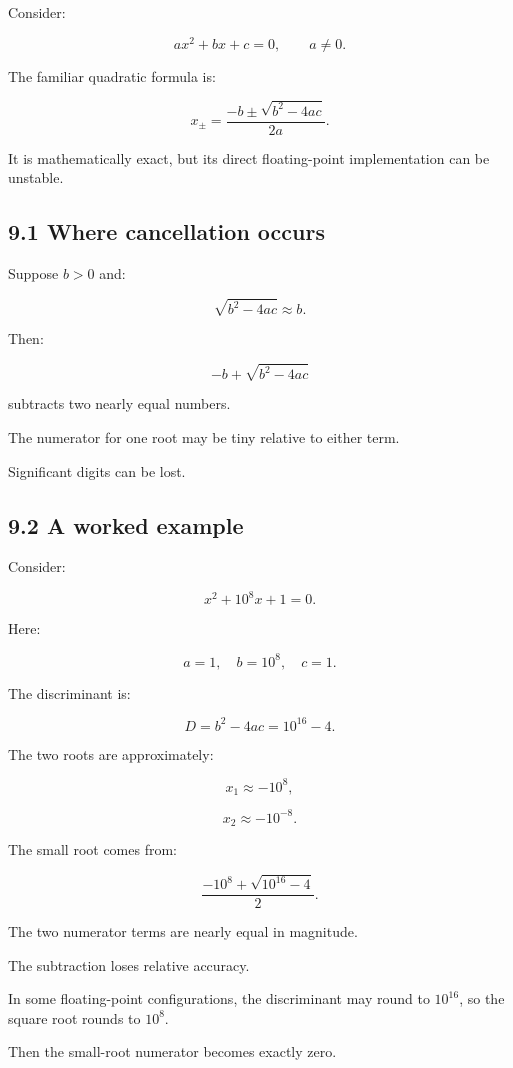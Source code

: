 Consider:

\[ \boxed{ax^2+bx+c=0}, \qquad a\ne0. \]

The familiar quadratic formula is:

\[ \boxed{ x_\pm= \frac{-b\pm\sqrt{b^2-4ac}}{2a} }. \]

It is mathematically exact, but its direct floating-point implementation can be unstable.

\subsection{9.1 Where cancellation occurs}\label{02-foundations-ii-ch028-where-cancellation-occurs}

Suppose \(b>0\) and:

\[ \sqrt{b^2-4ac}\approx b. \]

Then:

\[ -b+\sqrt{b^2-4ac} \]

subtracts two nearly equal numbers.

The numerator for one root may be tiny relative to either term.

Significant digits can be lost.

\subsection{9.2 A worked example}\label{02-foundations-ii-ch028-a-worked-example}

Consider:

\[ x^2+10^8x+1=0. \]

Here:

\[ a=1,\quad b=10^8,\quad c=1. \]

The discriminant is:

\[ D=b^2-4ac=10^{16}-4. \]

The two roots are approximately:

\[ x_1\approx-10^8, \]

\[ x_2\approx-10^{-8}. \]

The small root comes from:

\[ \frac{-10^8+\sqrt{10^{16}-4}}2. \]

The two numerator terms are nearly equal in magnitude.

The subtraction loses relative accuracy.

In some floating-point configurations, the discriminant may round to \(10^{16}\), so the square root rounds to \(10^8\).

Then the small-root numerator becomes exactly zero.

